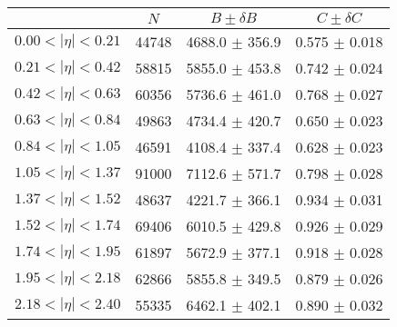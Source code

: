 \begin{tabular}{lccc}
\hline
    &   $N$   & $B \pm \delta B$  &  $C \pm \delta C$ \\
\hline
$0.00 < |\eta| <0.21$          & 44748      & 4688.0     $\pm$ 356.9 & 0.575      $\pm$ 0.018 \\
$0.21 < |\eta| <0.42$          & 58815      & 5855.0     $\pm$ 453.8 & 0.742      $\pm$ 0.024 \\
$0.42 < |\eta| <0.63$          & 60356      & 5736.6     $\pm$ 461.0 & 0.768      $\pm$ 0.027 \\
$0.63 < |\eta| <0.84$          & 49863      & 4734.4     $\pm$ 420.7 & 0.650      $\pm$ 0.023 \\
$0.84 < |\eta| <1.05$          & 46591      & 4108.4     $\pm$ 337.4 & 0.628      $\pm$ 0.023 \\
$1.05 < |\eta| <1.37$          & 91000      & 7112.6     $\pm$ 571.7 & 0.798      $\pm$ 0.028 \\
$1.37 < |\eta| <1.52$          & 48637      & 4221.7     $\pm$ 366.1 & 0.934      $\pm$ 0.031 \\
$1.52 < |\eta| <1.74$          & 69406      & 6010.5     $\pm$ 429.8 & 0.926      $\pm$ 0.029 \\
$1.74 < |\eta| <1.95$          & 61897      & 5672.9     $\pm$ 377.1 & 0.918      $\pm$ 0.028 \\
$1.95 < |\eta| <2.18$          & 62866      & 5855.8     $\pm$ 349.5 & 0.879      $\pm$ 0.026 \\
$2.18 < |\eta| <2.40$          & 55335      & 6462.1     $\pm$ 402.1 & 0.890      $\pm$ 0.032 \\
\hline
\end{tabular}
